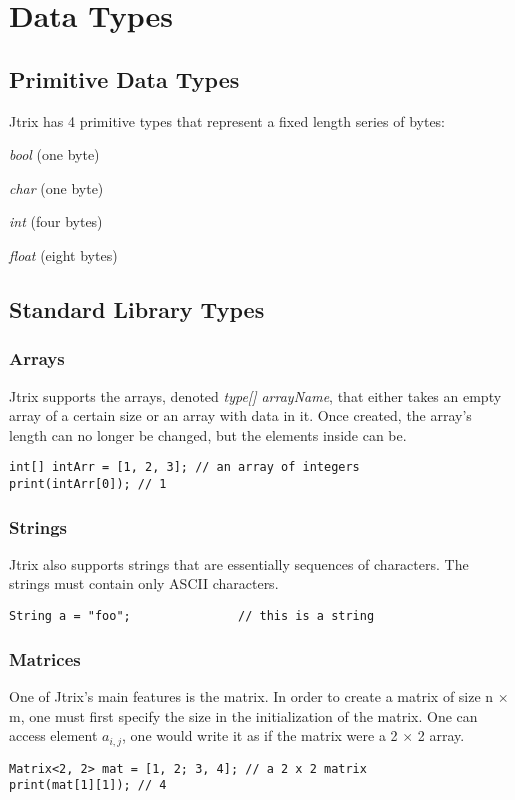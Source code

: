 \documentclass[12pt]{report}
\begin{document}
\tableofcontents

\chapter{Data Types}

\section{Primitive Data Types}
Jtrix has 4 primitive types that represent a fixed length series of bytes:

\textit{bool}  (one byte)

\textit{char}  (one byte)

\textit{int}   (four bytes)

\textit{float} (eight bytes)

\section{Standard Library Types}
\subsection{Arrays}
Jtrix supports the arrays, denoted \textit{type[] arrayName}, that either takes an empty array of a certain size or an array with data in it. Once created, the array's length can no longer be changed, but the elements inside can be.
\begin{lstlisting}
int[] intArr = [1, 2, 3]; // an array of integers
print(intArr[0]); // 1
\end{lstlisting}
\subsection{Strings}
Jtrix also supports strings that are essentially sequences of characters. The strings must contain only ASCII characters.
\begin{lstlisting}
String a = "foo";				// this is a string
\end{lstlisting}
\subsection{Matrices}
One of Jtrix's main features is the matrix. In order to create a matrix of size n $\times$ m, one must first specify the size in the initialization of the matrix. One can access element $a_{i,j}$, one would write it as if the matrix were a 2 $\times$ 2 array.
\begin{lstlisting}
Matrix<2, 2> mat = [1, 2; 3, 4]; // a 2 x 2 matrix
print(mat[1][1]); // 4 
\end{lstlisting}
\end{document}
